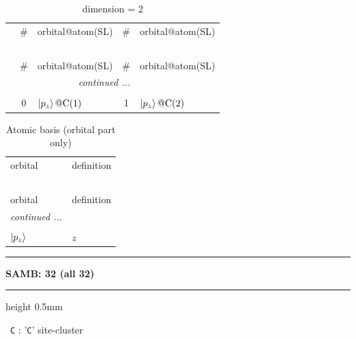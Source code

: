 \documentclass[fleqn,10pt,landscape]{jsarticle}
\begin{document}
\renewcommand{\arraystretch}{1.6}
\begin{longtable}[l]{c|cl|cl}
\captionsetup{justification=raggedright, singlelinecheck=off}
\caption{dimension = 2}
 \\
 \hline \hline
 & \# & orbital@atom(SL) & \# & orbital@atom(SL) \\ \hline \endfirsthead

\multicolumn{4}{l}{\tablename\ \thetable{}} \\
 \hline \hline
 & \# & orbital@atom(SL) & \# & orbital@atom(SL) \\ \hline \endhead

 \hline \hline
\multicolumn{4}{r}{\footnotesize\it continued ...} \\ \endfoot

 \hline \hline
\multicolumn{4}{r}{} \\ \endlastfoot

 & 0 & $\ket{p_{z}}@{\rm C}(1)$ & 1 & $\ket{p_{z}}@{\rm C}(2)$ \\
\end{longtable}
\renewcommand{\arraystretch}{1.6}
\begin{longtable}[l]{ll}
\captionsetup{justification=raggedright, singlelinecheck=off}
\caption{Atomic basis (orbital part only)}
 \\
 \hline \hline
orbital & definition \\ \hline \endfirsthead

\multicolumn{1}{l}{\tablename\ \thetable{}} \\
 \hline \hline
orbital & definition \\ \hline \endhead

 \hline \hline
\multicolumn{1}{r}{\footnotesize\it continued ...} \\ \endfoot

 \hline \hline
\multicolumn{1}{r}{} \\ \endlastfoot

$ \ket{p_{z}} $ & $ z $ \\
\end{longtable}
\vspace{5mm}
\noindent \rule[0.5mm]{5mm}{0.5mm}\hspace{3mm}\textbf{SAMB: 32 (all 32)}\hspace{3mm}\leaders\hrule height 0.5mm\hfill\kern0pt
\vspace{3mm}

\vspace{5mm}

\noindent\textbullet\, \texttt{C} : '\texttt{C}' site-cluster
\end{document}
